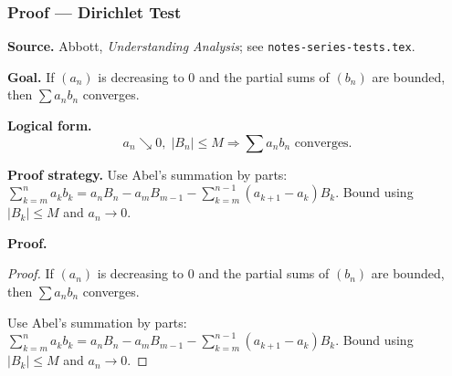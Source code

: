 

\clearpage
{}
\hypertarget{proof-RA-ABB-T-dirichlet-test}{}

\subsubsection[Dirichlet Test]{Proof --- Dirichlet Test}

\bigskip

\noindent
\textbf{Source.} Abbott, \emph{Understanding Analysis}; see \texttt{notes-series-tests.tex}.

\vspace{0.75em}

\noindent
\textbf{Goal.} If $(a_n)$ is decreasing to 0 and the partial sums of $(b_n)$ are bounded, then $\sum a_n b_n$ converges.

\vspace{0.75em}

\noindent
\textbf{Logical form.}
\[
  a_n \searrow 0,\; |B_n| \le M \Rightarrow \sum a_n b_n \text{ converges}.
\]

\vspace{0.75em}

\noindent
\textbf{Proof strategy.} Use Abel's summation by parts: $\sum_{k=m}^n a_k b_k = a_n B_n - a_m B_{m-1} - \sum_{k=m}^{n-1}(a_{k+1}-a_k)B_k$. Bound using $|B_k| \le M$ and $a_n \to 0$.

\vspace{0.75em}

\noindent
\textbf{Proof.}
\begin{proof}
\Claim If $(a_n)$ is decreasing to 0 and the partial sums of $(b_n)$ are bounded, then $\sum a_n b_n$ converges.

\Given 

\Goal 

\Strategy Use Abel's summation by parts: $\sum_{k=m}^n a_k b_k = a_n B_n - a_m B_{m-1} - \sum_{k=m}^{n-1}(a_{k+1}-a_k)B_k$. Bound using $|B_k| \le M$ and $a_n \to 0$.

\medskip


\end{proof}

